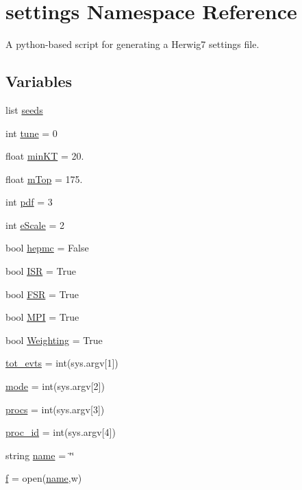 \hypertarget{namespacesettings}{}\section{settings Namespace Reference}
\label{namespacesettings}


A python-\/based script for generating a Herwig7 settings file.  


\subsection*{Variables}
\begin{DoxyCompactItemize}
\item 
list \hyperlink{namespacesettings_a8b4db2e0ad1b494a7e46577356f7a1b2}{seeds}
\item 
int \hyperlink{namespacesettings_a3a71b954dc507b7c139f5a59def558ac}{tune} = 0
\item 
float \hyperlink{namespacesettings_a041ea5ae27a35144e20d819d903e242f}{min\+KT} = 20.
\item 
float \hyperlink{namespacesettings_a9c21d19d19519afd9c32d6c6c8cd7be5}{m\+Top} = 175.
\item 
int \hyperlink{namespacesettings_acf9ea9fa8fde8d823a80f50e2059d636}{pdf} = 3
\item 
int \hyperlink{namespacesettings_ae5853b0ece109429ba3e5fdbbaea4cb3}{e\+Scale} = 2
\item 
bool \hyperlink{namespacesettings_a594c41de23324522b6d9c80046032a95}{hepmc} = False
\item 
bool \hyperlink{namespacesettings_a35611de950cb2fb15983284123fa724c}{I\+SR} = True
\item 
bool \hyperlink{namespacesettings_ac98d9a0de50c24fd4cc8ca6329a3e0c6}{F\+SR} = True
\item 
bool \hyperlink{namespacesettings_aa5b9f7d5c3011f7d0e4390a0955190e2}{M\+PI} = True
\item 
bool \hyperlink{namespacesettings_a73303983a691070f10b880f7a5960a39}{Weighting} = True
\item 
\hyperlink{namespacesettings_a05f6f4b8d16087cff8c66baecd6b9526}{tot\+\_\+evts} = int(sys.\+argv\mbox{[}1\mbox{]})
\item 
\hyperlink{namespacesettings_a51b31b0cdbe61e6cd2f758e8560898e9}{mode} = int(sys.\+argv\mbox{[}2\mbox{]})
\item 
\hyperlink{namespacesettings_ae0c0aa2289384505ec166c1b20c0f98c}{procs} = int(sys.\+argv\mbox{[}3\mbox{]})
\item 
\hyperlink{namespacesettings_a3f99a62963c1c5a80e211f1507f4c8b0}{proc\+\_\+id} = int(sys.\+argv\mbox{[}4\mbox{]})
\item 
string \hyperlink{namespacesettings_a503a5b5d5affd77fa0d769a08bc95a13}{name} = \char`\"{}\char`\"{}
\item 
\hyperlink{namespacesettings_a7f8f246eb917372c33fb5f296093ff70}{f} = open(\hyperlink{namespacesettings_a503a5b5d5affd77fa0d769a08bc95a13}{name},\textquotesingle{}w\textquotesingle{})
\end{DoxyCompactItemize}


